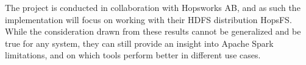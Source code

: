 The project is conducted in collaboration with Hopsworks AB, and as such the implementation will focus on working with their \gls{HDFS} distribution HopsFS. While the consideration drawn from these results cannot be generalized and be true for any system, they can still provide an insight into Apache Spark limitations, and on which tools perform better in different use cases. 